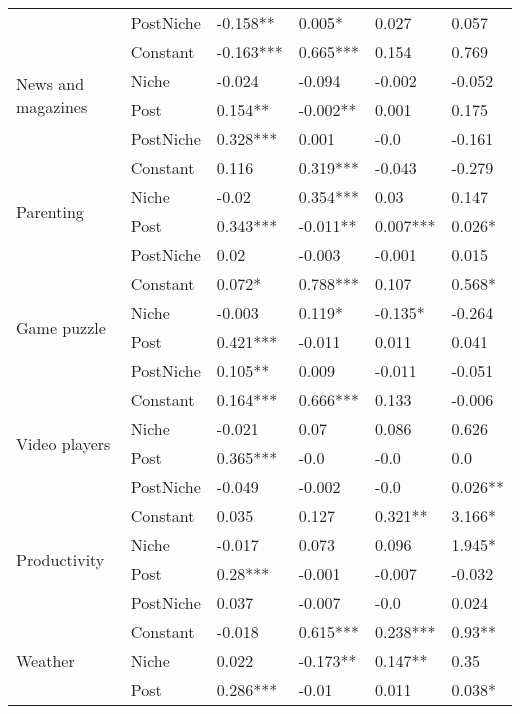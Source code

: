 \begin{table}[h!]
\begin{tabular}{llllll}
          & PostNiche &  -0.158** &  0.005* &  0.027 &  0.057 \\
\cline{1-6}
\multirow{4}{*}{News and magazines} & Constant &  -0.163*** &  0.665*** &  0.154 &  0.769 \\
          & Niche &  -0.024 &  -0.094 &  -0.002 &  -0.052 \\
          & Post &  0.154** &  -0.002** &  0.001 &  0.175 \\
          & PostNiche &  0.328*** &  0.001 &  -0.0 &  -0.161 \\
\cline{1-6}
\multirow{4}{*}{Parenting} & Constant &  0.116 &  0.319*** &  -0.043 &  -0.279 \\
          & Niche &  -0.02 &  0.354*** &  0.03 &  0.147 \\
          & Post &  0.343*** &  -0.011** &  0.007*** &  0.026* \\
          & PostNiche &  0.02 &  -0.003 &  -0.001 &  0.015 \\
\cline{1-6}
\multirow{4}{*}{Game puzzle} & Constant &  0.072* &  0.788*** &  0.107 &  0.568* \\
          & Niche &  -0.003 &  0.119* &  -0.135* &  -0.264 \\
          & Post &  0.421*** &  -0.011 &  0.011 &  0.041 \\
          & PostNiche &  0.105** &  0.009 &  -0.011 &  -0.051 \\
\cline{1-6}
\multirow{4}{*}{Video players} & Constant &  0.164*** &  0.666*** &  0.133 &  -0.006 \\
          & Niche &  -0.021 &  0.07 &  0.086 &  0.626 \\
          & Post &  0.365*** &  -0.0 &  -0.0 &  0.0 \\
          & PostNiche &  -0.049 &  -0.002 &  -0.0 &  0.026** \\
\cline{1-6}
\multirow{4}{*}{Productivity} & Constant &  0.035 &  0.127 &  0.321** &  3.166* \\
          & Niche &  -0.017 &  0.073 &  0.096 &  1.945* \\
          & Post &  0.28*** &  -0.001 &  -0.007 &  -0.032 \\
          & PostNiche &  0.037 &  -0.007 &  -0.0 &  0.024 \\
\cline{1-6}
\multirow{4}{*}{Weather} & Constant &  -0.018 &  0.615*** &  0.238*** &  0.93** \\
          & Niche &  0.022 &  -0.173** &  0.147** &  0.35 \\
          & Post &  0.286*** &  -0.01 &  0.011 &  0.038* \\

\end{tabular}
\end{table}
